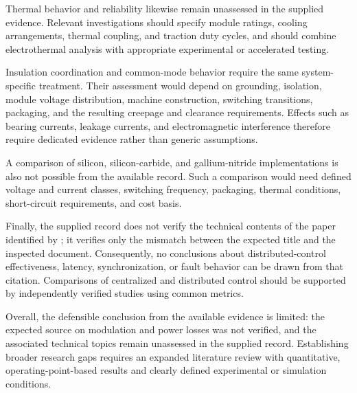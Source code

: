 Thermal behavior and reliability likewise remain unassessed in the supplied evidence. Relevant investigations should specify module ratings, cooling arrangements, thermal coupling, and traction duty cycles, and should combine electrothermal analysis with appropriate experimental or accelerated testing. %

Insulation coordination and common-mode behavior require the same system-specific treatment. Their assessment would depend on grounding, isolation, module voltage distribution, machine construction, switching transitions, packaging, and the resulting creepage and clearance requirements. Effects such as bearing currents, leakage currents, and electromagnetic interference therefore require dedicated evidence rather than generic assumptions. %

A comparison of silicon, silicon-carbide, and gallium-nitride implementations is also not possible from the available record. Such a comparison would need defined voltage and current classes, switching frequency, packaging, thermal conditions, short-circuit requirements, and cost basis. %

Finally, the supplied record does not verify the technical contents of the paper identified by \cite{Jin2017}; it verifies only the mismatch between the expected title and the inspected document. Consequently, no conclusions about distributed-control effectiveness, latency, synchronization, or fault behavior can be drawn from that citation. Comparisons of centralized and distributed control should be supported by independently verified studies using common metrics. %

Overall, the defensible conclusion from the available evidence is limited: the expected source on modulation and power losses was not verified, and the associated technical topics remain unassessed in the supplied record. Establishing broader research gaps requires an expanded literature review with quantitative, operating-point-based results and clearly defined experimental or simulation conditions. %